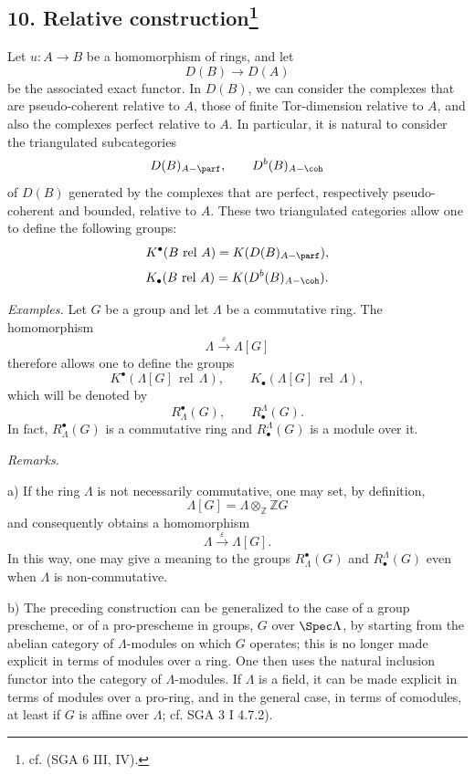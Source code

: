 \subsection*{10. Relative construction\footnote{cf. (SGA 6 III, IV).}}

Let $u:A\to B$ be a homomorphism of rings, and let
\[
D(B)\longrightarrow D(A)
\]
be the associated exact functor. In $D(B)$, we can consider the complexes that are pseudo-coherent relative to $A$, those of finite Tor-dimension relative to $A$, and also the complexes perfect relative to $A$. In particular, it is natural to consider the triangulated subcategories
\[
D(B)_{A-\parf},\qquad D^b(B)_{A-\coh}
\]
of $D(B)$ generated by the complexes that are perfect, respectively pseudo-coherent and bounded, relative to $A$. These two triangulated categories allow one to define the following groups:
\[
K^\bullet(B\operatorname{\,rel\,}A)=K(D(B)_{A-\parf}),
\]
\[
K_\bullet(B\operatorname{\,rel\,}A)=K(D^b(B)_{A-\coh}).
\]

\emph{Examples.} Let $G$ be a group and let $\Lambda$ be a commutative ring. The homomorphism
\[
\Lambda\xrightarrow{\varepsilon}\Lambda[G]
\]
therefore allows one to define the groups
\[
K^\bullet(\Lambda[G]\operatorname{\,rel\,}\Lambda),\qquad
K_\bullet(\Lambda[G]\operatorname{\,rel\,}\Lambda),
\]
which will be denoted by
\[
R^\bullet_\Lambda(G),\qquad R^\Lambda_\bullet(G).
\]
In fact, $R^\bullet_\Lambda(G)$ is a commutative ring and $R^\Lambda_\bullet(G)$ is a module over it.

\emph{Remarks.}

a) If the ring $\Lambda$ is not necessarily commutative, one may set, by definition,
\[
\Lambda[G]=\Lambda\otimes_{\mathbb Z}\mathbb ZG
\]
and consequently obtains a homomorphism
\[
\Lambda\xrightarrow{\varepsilon}\Lambda[G].
\]
In this way, one may give a meaning to the groups $R^\bullet_\Lambda(G)$ and $R^\Lambda_\bullet(G)$ even when $\Lambda$ is non-commutative.

b) The preceding construction can be generalized to the case of a group prescheme, or of a pro-prescheme in groups, $G$ over $\Spec\Lambda$, by starting from the abelian category of $\Lambda$-modules on which $G$ operates; this is no longer made explicit in terms of modules over a ring. One then uses the natural inclusion functor into the category of $\Lambda$-modules. If $\Lambda$ is a field, it can be made explicit in terms of modules over a pro-ring, and in the general case, in terms of comodules, at least if $G$ is affine over $\Lambda$; cf. SGA 3 I 4.7.2).

